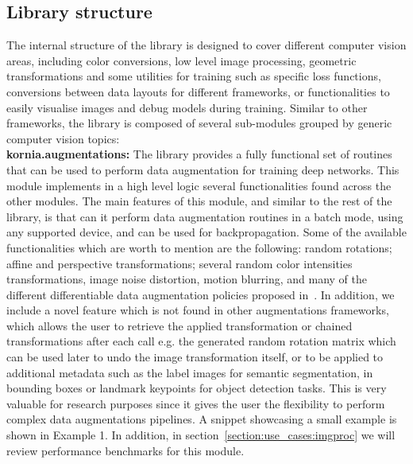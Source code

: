 \subsection{Library structure}
\label{section:kornia:library_structure}

The internal structure of the library is designed to cover different computer vision areas, including color conversions, low level image processing, geometric transformations and some utilities for training  such as specific  loss functions, conversions between data layouts for different frameworks, or functionalities to easily visualise images and debug models during   training. Similar to other frameworks, the library is composed of several sub-modules grouped by generic computer vision topics:\\

\noindent\textbf{kornia.augmentations:} The library provides a fully functional set of routines that can be used to perform data augmentation for training deep networks. This module implements in a high level logic several functionalities found across the other modules. The main features of this  module, and similar to the rest of the library, is that can it perform data augmentation routines in a batch mode, using any supported device, and can be used for backpropagation. Some of the available functionalities which are worth to mention are the following: random rotations; affine and perspective transformations; several random color intensities transformations, image noise distortion, motion blurring, and many of the different differentiable data augmentation policies proposed in~\citep{DBLP:journals/corr/abs-2004-11966, huang20}. In addition, we include a novel feature which is not found in  other augmentations frameworks, which allows the user to retrieve the applied transformation or chained transformations after each call e.g. the generated random rotation matrix which can be used later to undo the image transformation itself, or to be applied to additional metadata such as the label images for semantic segmentation, in bounding boxes or landmark keypoints for object detection tasks. This is very valuable for research purposes since it gives  the user the flexibility to perform complex data augmentations pipelines. A snippet showcasing a small example is shown in Example 1. In addition, in section~\ref{section:use_cases:imgproc} we will review performance benchmarks for this module.

\vspace{.5cm}

